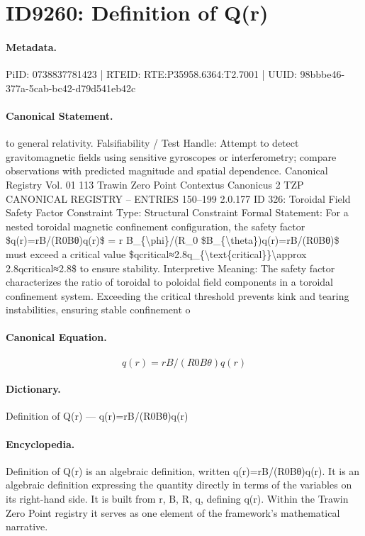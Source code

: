 \section*{ID9260: Definition of Q(r)}
\paragraph{Metadata.}
PiID: 0738837781423 | RTEID: RTE:P35958.6364:T2.7001 | UUID: 98bbbe46-377a-5cab-bc42-d79d541eb42c

\paragraph{Canonical Statement.}
to general relativity. Falsifiability / Test Handle: Attempt to detect gravitomagnetic fields using sensitive gyroscopes or interferometry; compare observations with predicted magnitude and spatial dependence. Canonical Registry Vol. 01 113 Trawin Zero Point Contextus Canonicus 2 TZP CANONICAL REGISTRY – ENTRIES 150–199 2.0.177 ID 326: Toroidal Field Safety Factor Constraint Type: Structural Constraint Formal Statement: For a nested toroidal magnetic confinement configuration, the safety factor \$q(r)=rB/(R0Bθ)q(r)\$ = r B\_\{\textbackslash{}phi\}/(R\_0 \$B\_\{\textbackslash{}theta\})q(r)=rB/(R0Bθ)\$ must exceed a critical value \$qcritical≈2.8q\_\{\textbackslash{}text\{critical\}\}\textbackslash{}approx 2.8qcritical≈2.8\$ to ensure stability. Interpretive Meaning: The safety factor characterizes the ratio of toroidal to poloidal field components in a toroidal confinement system. Exceeding the critical threshold prevents kink and tearing instabilities, ensuring stable confinement o

\paragraph{Canonical Equation.}
\[
q(r)=rB/(R0Bθ)q(r)
\]

\paragraph{Dictionary.}
Definition of Q(r) — q(r)=rB/(R0Bθ)q(r)

\paragraph{Encyclopedia.}
Definition of Q(r) is an algebraic definition, written q(r)=rB/(R0Bθ)q(r). It is an algebraic definition expressing the quantity directly in terms of the variables on its right-hand side. It is built from r, B, R, q, defining q(r). Within the Trawin Zero Point registry it serves as one element of the framework's mathematical narrative.
